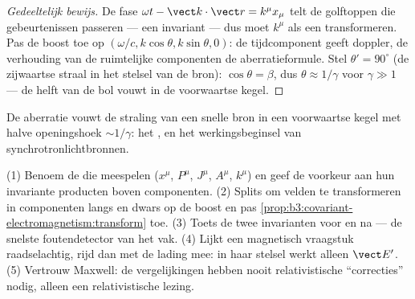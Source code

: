 \begin{proof}[Gedeeltelijk bewijs]
De fase $\omega t - \vect k\cdot\vect r = k^\mu x_\mu$ telt de golftoppen
die gebeurtenissen passeren --- een invariant --- dus moet $k^\mu$ als een
 transformeren. Pas de boost toe op $(\omega/c, k\cos\theta,
k\sin\theta, 0)$: de tijdcomponent geeft doppler, de verhouding van de
ruimtelijke componenten de aberratieformule. Stel $\theta' =
90^\circ$
(de zijwaartse straal in het stelsel van de bron): $\cos\theta =
\beta$,
dus $\theta \approx 1/\gamma$ voor $\gamma \gg 1$ --- de helft van de bol
vouwt in de voorwaartse kegel.
\end{proof}

\begin{omfigure}

{\small De aberratie vouwt de straling van een snelle bron in een
voorwaartse kegel met halve openingshoek $\sim 1/\gamma$: het
, en het werkingsbeginsel van synchrotronlichtbronnen.}
\end{omfigure}

\begin{method}\label{met:b3:covariant-electromagnetism:method}
(1) Benoem de  die meespelen ($x^\mu$, $P^\mu$, $J^\mu$,
$A^\mu$, $k^\mu$) en geef de voorkeur aan hun invariante producten boven
componenten. (2) Splits om velden te transformeren in componenten langs en
dwars op de boost en pas
\cref{prop:b3:covariant-electromagnetism:transform} toe. (3) Toets de twee
invarianten voor en na --- de snelste foutendetector van het vak. (4)
Lijkt een magnetisch vraagstuk raadselachtig, rijd dan met de lading mee:
in haar stelsel werkt alleen $\vect E'$. (5) Vertrouw Maxwell: de
vergelijkingen hebben nooit relativistische ``correcties'' nodig, alleen
een relativistische lezing.
\end{method}

